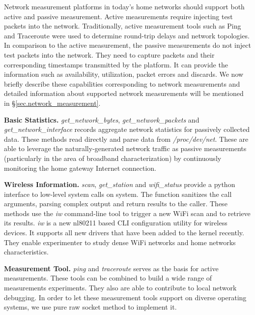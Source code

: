 Network measurement platforms in today's home networks should support both active and passive measurement. Active measurements require injecting test packets into the network. Traditionally, active measurement tools such as Ping\cite{ping} and Traceroute\cite{traceroute} were used to determine round-trip delays and network topologies. In comparison to the active measurement, the passive measurements do not inject test packets into the network. They need to capture packets and their corresponding timestamps transmitted by the platform. It can provide the information such as availability, utilization, packet errors and discards\cite{calyamactive}. We now briefly describe these capabilities corresponding to network measurements and detailed information about supported network measurements will be mentioned in \S{\ref{sec.network_measurement}}.

\textbf{Basic Statistics.} \textit{get\_network\_bytes}, \textit{get\_network\_packets} and \textit{get\_network\_interface} records aggregate network statistics for passively collected data. These methods read directly and parse data from \emph{/proc/dev/net}. These are able to leverage the naturally-generated network traffic as passive measurements (particularly in the area of broadband characterization) by continuously monitoring the home gateway Internet connection.

\textbf{Wireless Information.} \textit{scan}, \textit{get\_station} and \textit{wifi\_status} provide a python interface to low-level system calls on system. The function sanitizes the call arguments, parsing complex output and return results to the caller. These methods use the \emph{iw} command-line tool to trigger a new WiFi scan and to retrieve its results. \emph{iw} is a new nl80211 based CLI configuration utility for wireless devices. It supports all new drivers that have been added to the kernel recently.\cite{iw} They enable experimenter to study dense WiFi networks and home networks characteristics.

\textbf{Measurement Tool.} \textit{ping} and \textit{traceroute} serves as the basis for active measurements. These tools can be combined to build a wide range of measurements experiments. They also are able to contribute to local network debugging. In order to let these measurement tools support on diverse operating systems, we use pure raw socket method to implement it. 


